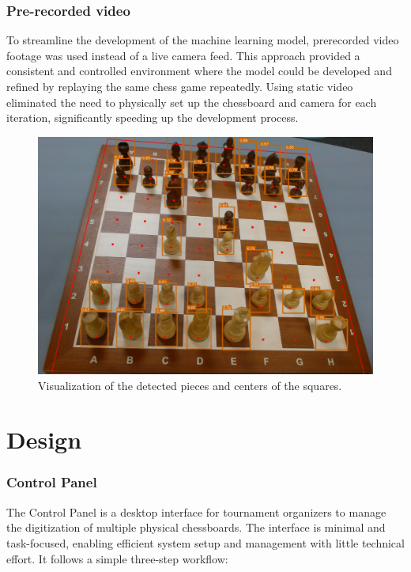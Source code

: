 \newpage

\subsubsection*{Pre-recorded video}

To streamline the development of the machine learning model, prerecorded video footage was used instead of a live camera feed. This approach provided a consistent and controlled environment where the model could be developed and refined by replaying the same chess game repeatedly. Using static video eliminated the need to physically set up the chessboard and camera for each iteration, significantly speeding up the development process. \\

\begin{figure}[h!]
    \centering
    \includegraphics[width=0.75\linewidth]{figures/methods/ml-models/piece-model.png}
    \caption[Visualization of piece model and corner model]{Visualization of the detected pieces and centers of the squares.}
    \label{fig:websocket-vs-http}
\end{figure}

\bigskip

\section{Design}
\label{subsec:wireframe}

\subsubsection*{Control Panel}

The Control Panel is a desktop interface for tournament organizers to manage the digitization of multiple physical chessboards. The interface is minimal and task-focused, enabling efficient system setup and management with little technical effort. It follows a simple three-step workflow:

